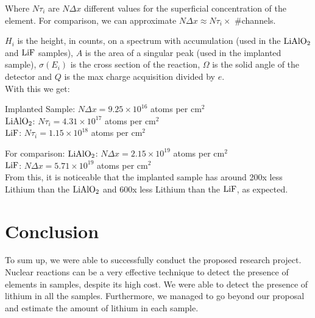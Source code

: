 \documentclass{article}
\begin{document}
\begin{multicols}{2}
\vspace{4mm}

Where $N\tau_i$ are $N\Delta x$ different values for the superficial concentration of the element. For comparison, we can approximate $N\Delta x \approx N\tau_i \times$ \#channels.

$H_i$ is the height, in counts, on a spectrum with accumulation (used in the $\ce{LiAlO2}$ and $\ce{LiF}$ samples), $A$ is the area of a singular peak (used in the implanted sample), $\sigma (E_i) $ is the cross section of the reaction, $\Omega$ is the solid angle of the detector and $Q$ is the max charge acquisition divided by $e$.\\

With this we get:

Implanted Sample: $N\Delta x = 9.25\times 10^{16}$ atoms per cm$^2$\\
$\ce{LiAlO2}$: $N\tau_i=4.31\times10^{17}$ atoms per cm$^2$\\
$\ce{LiF}$: $N\tau_i=1.15\times10^{18}$ atoms per cm$^2$

For comparison:
$\ce{LiAlO2}$: $N\Delta x=2.15\times10^{19}$ atoms per cm$^2$\\
$\ce{LiF}$: $N\Delta x=5.71\times10^{19}$ atoms per cm$^2$\\

From this, it is noticeable that the implanted sample has around 200x less Lithium than the $\ce{LiAlO2}$ and 600x less Lithium than the $\ce{LiF}$, as expected.

\section{Conclusion}
    \label{sec:conclusion}

To sum up, we were able to successfully conduct the proposed research project.
Nuclear reactions can be a very effective technique to detect the presence of elements in samples, despite its high cost.
We were able to detect the presence of lithium in all the samples. 
Furthermore, we managed to go beyond our proposal and estimate the amount of lithium in each sample.

\printbibliography
\nocite{*}

\end{multicols}
\end{document}
